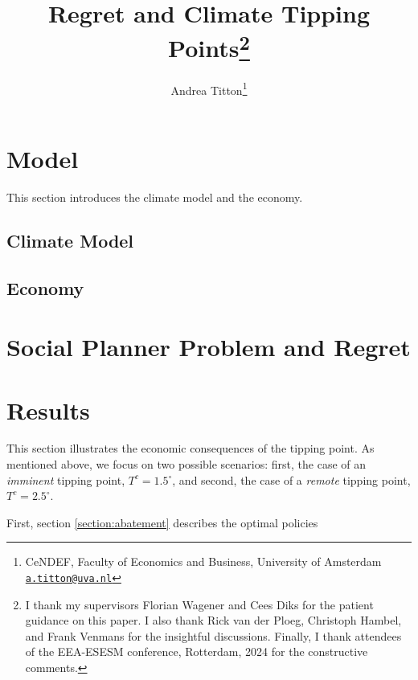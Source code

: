 \documentclass[12pt]{article}
\author{Andrea Titton\thanks{CeNDEF, Faculty of Economics and Business, University of Amsterdam
    \href{mailto:a.titton@uva.nl}{\texttt{a.titton@uva.nl}}}}
\title{Regret and Climate Tipping Points\thanks{
      I thank my supervisors Florian Wagener and Cees Diks for the patient guidance on this paper. I also thank Rick van der Ploeg, Christoph Hambel, and Frank Venmans for the insightful discussions. Finally, I thank attendees of the EEA-ESESM conference, Rotterdam, 2024 for the constructive comments.
    }}
\begin{document}
\maketitle

\iffalse
\begin{abstract}
  Climate tipping points can lead to abrupt climate change and the costs associated with it.
\end{abstract}
\fi

\newpage


\section{Model}

This section introduces the climate model and the economy.

\subsection{Climate Model}



\subsection{Economy}




\section{Social Planner Problem and Regret}



\section{Results}

This section illustrates the economic consequences of the tipping point. As mentioned above, we focus on two possible scenarios: first, the case of an \textit{imminent} tipping point, $T^c = 1.5^{\circ}$, and second, the case of a \textit{remote} tipping point, $T^c = 2.5^{\circ}$. 

First, section \ref{section:abatement} describes the optimal policies



\end{document}
